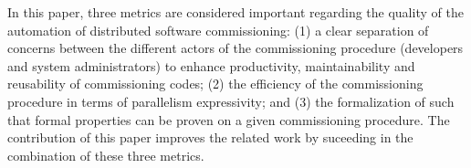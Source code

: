 

In this paper, three metrics are considered important regarding the
quality of the automation of distributed software commissioning: (1) a
clear separation of concerns between the different actors of the
commissioning procedure (\ie developers and system administrators) to
enhance productivity, maintainability and reusability of commissioning
codes; (2) the efficiency of the commissioning procedure in terms of
parallelism expressivity; and (3) the formalization of  such
that formal properties can be proven on a given commissioning
procedure. The contribution of this paper improves the related work by
suceeding in the combination of these three metrics.

